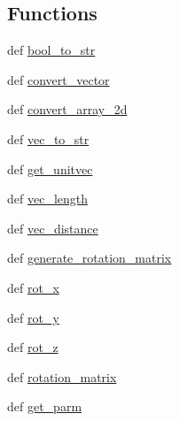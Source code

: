 \subsection*{Functions}
\begin{DoxyCompactItemize}
\item 
def \hyperlink{namespace_d_f_t___k_i_t_1_1core_1_1general__tool_a525ff8a009f3070f80bfb7070de721d6}{bool\+\_\+to\+\_\+str}
\item 
def \hyperlink{namespace_d_f_t___k_i_t_1_1core_1_1general__tool_a551c90fa70063bac9c6b1ac57837e992}{convert\+\_\+vector}
\item 
def \hyperlink{namespace_d_f_t___k_i_t_1_1core_1_1general__tool_ac9f04e84b836161ac4df0123a69bc5c3}{convert\+\_\+array\+\_\+2d}
\item 
def \hyperlink{namespace_d_f_t___k_i_t_1_1core_1_1general__tool_ab402c32db10253aa094106f1842b1cc7}{vec\+\_\+to\+\_\+str}
\item 
def \hyperlink{namespace_d_f_t___k_i_t_1_1core_1_1general__tool_a56b308969bda4b971b1cd71b57027660}{get\+\_\+unitvec}
\item 
def \hyperlink{namespace_d_f_t___k_i_t_1_1core_1_1general__tool_aa8817cdbf2796a160a5f10cde9295206}{vec\+\_\+length}
\item 
def \hyperlink{namespace_d_f_t___k_i_t_1_1core_1_1general__tool_a144ce93aeaaf93b6493efb2e2f245838}{vec\+\_\+distance}
\item 
def \hyperlink{namespace_d_f_t___k_i_t_1_1core_1_1general__tool_a48bd79d489d15f1b1cf4f062a97cafbe}{generate\+\_\+rotation\+\_\+matrix}
\item 
def \hyperlink{namespace_d_f_t___k_i_t_1_1core_1_1general__tool_adc4994a6c61db4260a85ac51e061e9c6}{rot\+\_\+x}
\item 
def \hyperlink{namespace_d_f_t___k_i_t_1_1core_1_1general__tool_a2a59f2adebcffbf4e260047677901967}{rot\+\_\+y}
\item 
def \hyperlink{namespace_d_f_t___k_i_t_1_1core_1_1general__tool_a0a4b8f9d477deb93fc2dac542c38c2c9}{rot\+\_\+z}
\item 
def \hyperlink{namespace_d_f_t___k_i_t_1_1core_1_1general__tool_aebcbefedea77b8b48b5065b6d0c08d05}{rotation\+\_\+matrix}
\item 
def \hyperlink{namespace_d_f_t___k_i_t_1_1core_1_1general__tool_a67ec0c9eab0f48edee2232c7420c29a8}{get\+\_\+parm}
\end{DoxyCompactItemize}


